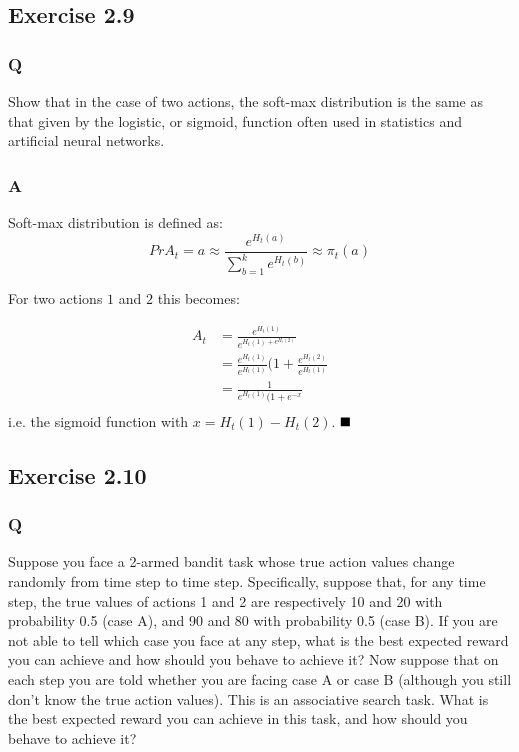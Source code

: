 \subsection{Exercise 2.9}
\subsubsection*{Q}
Show that in the case of two actions, the soft-max distribution is the same as that given by the logistic, or sigmoid, function often used in statistics and artificial neural networks.

\subsubsection*{A}
Soft-max distribution is defined as:
\begin{equation}
	Pr{A_t = a} \approx \frac{e^{H_t(a)}}{\sum_{b=1}^{k} e^{H_t(b)}} \approx \pi_t(a)
\end{equation}

For two actions \(1\) and \(2\) this becomes:

\begin{align}
	A_t  &= \frac{e^{H_t(1)}}{e^{H_t(1) + e^{H_t(2)}}}  \\
	&= \frac{e^{H_t(1)}}{e^{H_t(1)}}{(1 + \frac{e^{H_t(2)}}{e^{H_t(1)}}}  \\
	&= \frac{1}{e^{H_t(1)}(1 + e^{-x}}  \\
\end{align}
i.e. the sigmoid function with $x = H_t(1) - H_t(2)$.
$
\hfill \blacksquare
$

\subsection{Exercise 2.10}
\subsubsection*{Q}
Suppose you face a 2-armed bandit task whose true action values change randomly from time step to time step. Specifically, suppose that, for any time step, the true values of actions 1 and 2 are respectively 10 and 20 with probability 0.5 (case A), and 90 and 80 with probability 0.5 (case B). If you are not able to tell which case you face at any step, what is the best expected reward you can achieve and how should you behave to achieve it? Now suppose that on each step you are told whether you are facing case A or case B (although you still don’t know the true action values). This is an associative search task. What is the best expected reward you can achieve in this task, and how should you behave to achieve it?


